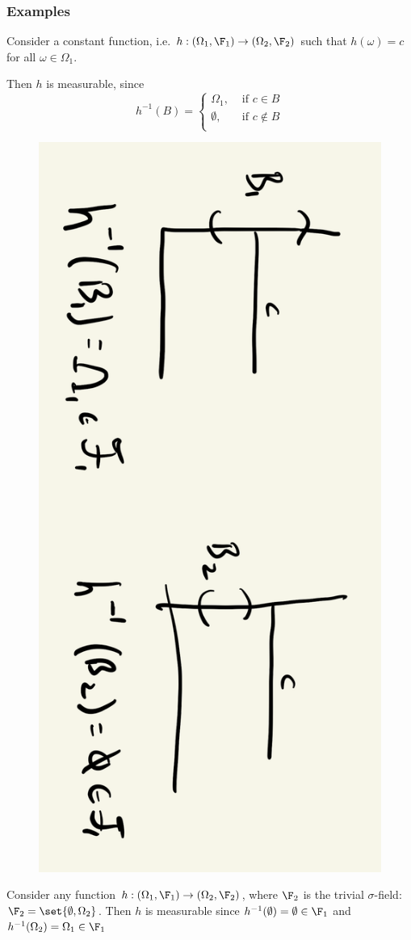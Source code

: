 \documentclass{article} %
\newif\ifActive
\begin{document}
\subsubsection{Examples}

\begin{example}{}
Consider a constant function, i.e. $h: (\Omega_1, \F_1) \to (\Omega_2, \F_2)$ such that $h(\omega) =   c$ for all $\omega \in \Omega_1$.  
\ifActive 
	\textbf{Workshop Exercise:} Show that $h$ is measurable. 
\else 
	Then $h$ is measurable, since 
	\[ h^{-1}(B) = 
	\begin{cases}
	\Omega_1, & \text{ if } c \in B\\ 
	\emptyset, & \text{ if } c \not\in B\\ 
	\end{cases}
	\]
	
	\begin{figure}[H]
	\centering
	\includegraphics[angle=90, width=.5\textwidth]{images/constant_functions_are_measurable}
	\end{figure}
\fi 
\label{ex:constant_functions_are_measurable}
\end{example}

\begin{example}{}
Consider any function $h : (\Omega_1, \F_1) \to (\Omega_2, \F_2)$, where $\F_2$ is the trivial $\sigma$-field: $\F_2 = \set{\emptyset, \Omega_2}$.  Then $h$ is measurable since $h^{-1}(\emptyset) = \emptyset \in \F_1$ and  $h^{-1}(\Omega_2) = \Omega_1 \in \F_1$
\label{ex:any_function_is_measurable_with_respect_to_trivial_sigma_field}	
\end{example}
\end{document}
